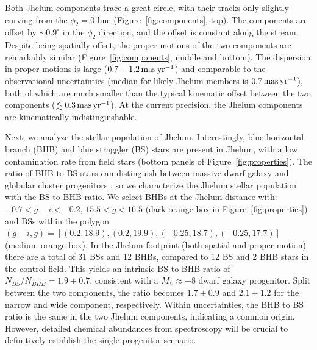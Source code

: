 \documentclass[twocolumn]{aastex62}
\begin{document}
Both Jhelum components trace a great circle, with their tracks only slightly curving from the $\phi_2=0$ line (Figure~\ref{fig:components}, top).
The components are offset by $\sim0.9^\circ$ in the $\phi_2$ direction, and the offset is constant along the stream.
Despite being spatially offset, the proper motions of the two components are remarkably similar (Figure~\ref{fig:components}, middle and bottom).
The dispersion in proper motions is large ($0.7-1.2\,\rm mas\,yr^{-1}$) and comparable to the observational uncertainties (median for likely Jhelum members is $0.7\rm\, mas\, yr^{-1}$), both of which are much smaller than the typical kinematic offset between the two components ($\lesssim0.3\,\rm mas\,yr^{-1}$).
At the current precision, the Jhelum components are kinematically indistinguishable.

Next, we analyze the stellar population of Jhelum.
Interestingly, blue horizontal branch (BHB) and blue straggler (BS) stars are present in Jhelum, with a low contamination rate from field stars (bottom panels of Figure~\ref{fig:properties}).
The ratio of BHB to BS stars can distinguish between massive dwarf galaxy and globular cluster progenitors \citep[e.g.,][]{deason2015}, so we characterize the Jhelum stellar population with the BS to BHB ratio.
We select BHBs at the Jhelum distance with: $-0.7<g-i<-0.2$, $15.5<g<16.5$ (dark orange box in Figure~\ref{fig:properties}) and BSs within the polygon $(g-i,g) = [(0.2,18.9), (0.2, 19.9), (-0.25, 18.7), (-0.25,17.7)]$ (medium orange box).
In the Jhelum footprint (both spatial and proper-motion) there are a total of 31 BSs and 12 BHBs, compared to 12 BS and 2 BHB stars in the control field.
This yields an intrinsic BS to BHB ratio of $N_{BS} / N_{BHB} = 1.9\pm 0.7$, consistent with a $M_V\approx-8$ dwarf galaxy progenitor.
Split between the two components, the ratio becomes $1.7\pm0.9$ and $2.1\pm1.2$ for the narrow and wide component, respectively.
Within uncertainties, the BHB to BS ratio is the same in the two Jhelum components, indicating a common origin.
However, detailed chemical abundances from spectroscopy will be crucial to definitively establish the single-progenitor scenario.
\end{document}
